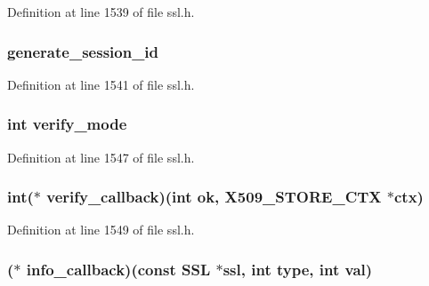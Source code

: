 Definition at line 1539 of file ssl.\+h.

\subsubsection[{\texorpdfstring{generate\+\_\+session\+\_\+id}{generate_session_id}}]{ generate\+\_\+session\+\_\+id}\hypertarget{structssl__st_af147f6b9a405e9e8a94d7e5185381d57}{}\label{structssl__st_af147f6b9a405e9e8a94d7e5185381d57}


Definition at line 1541 of file ssl.\+h.

\subsubsection[{\texorpdfstring{verify\+\_\+mode}{verify_mode}}]{\setlength{\rightskip}{0pt plus 5cm}int verify\+\_\+mode}\hypertarget{structssl__st_a96628f727de36322f51c8833ecd26668}{}\label{structssl__st_a96628f727de36322f51c8833ecd26668}


Definition at line 1547 of file ssl.\+h.

\subsubsection[{\texorpdfstring{verify\+\_\+callback}{verify_callback}}]{\setlength{\rightskip}{0pt plus 5cm}int($\ast$ verify\+\_\+callback)(int ok, {\bf X509\+\_\+\+S\+T\+O\+R\+E\+\_\+\+C\+TX} $\ast${\bf ctx})}\hypertarget{structssl__st_abe8961b76f34a37acc0693435919e301}{}\label{structssl__st_abe8961b76f34a37acc0693435919e301}


Definition at line 1549 of file ssl.\+h.

\subsubsection[{\texorpdfstring{info\+\_\+callback}{info_callback}}]{($\ast$ info\+\_\+callback)(const {\bf S\+SL} $\ast$ssl, int {\bf type}, int val)}\hypertarget{structssl__st_a185f1e577fa5512b45a82a08e1b28805}{}\label{structssl__st_a185f1e577fa5512b45a82a08e1b28805}


